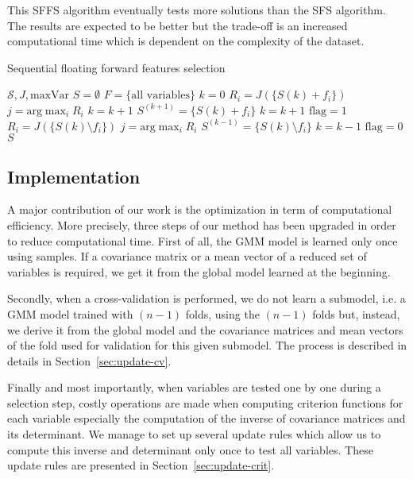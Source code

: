 \documentclass[a4paper,11pt,DIV=16,abstracton]{scrartcl}
\begin{document}
    This SFFS algorithm eventually tests more solutions than the SFS algorithm. The results are expected to be better but the trade-off is an increased computational time which is dependent on the complexity of the dataset.

    \begin{algorithm}
    \caption{Sequential floating forward features selection\label{alg:sffs}}
    {\fontsize{10}{10}\selectfont
    \begin{algorithmic}[1]
    \REQUIRE $\mathcal{S},J,\text{maxVar}$
    \STATE $S=\emptyset$
    \STATE $F=\text{\{all variables\}}$
    \STATE $k=0$
    \STATE $R_i = J(\{S{(k)} + f_i\})$
    \ENDFOR
    \STATE $j=\text{arg} \max_{i} R_i$
    \STATE $k=k+1$
    \ELSE
    \STATE $S^{(k+1)} = \{S{(k)} + f_i\}$
    \STATE $k=k+1$
    \STATE $\text{flag}=1$
    \STATE $R_i = J(\{S{(k)}\setminus f_i\})$
    \ENDFOR
    \STATE $j=\text{arg} \max_{i} R_i$
    \STATE $S^{(k-1)} = \{S{(k)} \setminus f_i\}$
    \STATE $k=k-1$
    \ELSE
    \STATE $\text{flag}=0$
    \ENDIF
    \ENDWHILE
    \ENDIF
    \ENDWHILE
    \RETURN $S$
    \end{algorithmic}
    }
    \end{algorithm}

    \subsection{Implementation}
    A major contribution of our work is the optimization in term of computational efficiency. More precisely, three steps of our method has been upgraded in order to reduce computational time. First of all, the GMM model is learned only once using samples. If a covariance matrix or a mean vector of a reduced set of variables is required, we get it from the global model learned at the beginning.

    Secondly, when a cross-validation is performed, we do not learn a submodel, i.e. a GMM model trained with $(n-1)$ folds, using the $(n-1)$ folds but, instead, we derive it from the global model and the covariance matrices and mean vectors of the fold used for validation for this given submodel. The process is described in details in Section~\ref{sec:update-cv}.

    Finally and most importantly, when variables are tested one by one during a selection step, costly operations are made when computing criterion functions for each variable especially the computation of the inverse of covariance matrices and its determinant. We manage to set up several update rules which allow us to compute this inverse and determinant only once to test all variables. These update rules are presented in Section~\ref{sec:update-crit}.
\end{document}
